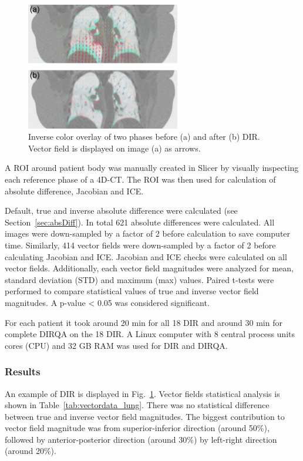 \begin{figure}[H]
	\begin{center}		
		\includegraphics[width=0.6\textwidth]{./VisualMotionManagment/Images/exampleReg.png}
		\caption{Inverse color overlay of two phases before (a) and after (b) DIR. Vector field is displayed on image (a) as arrows.}
		\label{exampleReg_lung}
	\end{center}
\end{figure}

A ROI around patient body was manually created in Slicer by visually inspecting each reference phase of a 4D-CT. The ROI was then used for calculation of absolute difference, Jacobian and ICE.

Default, true and inverse absolute difference were calculated (see Section~\ref{sec:absDiff}). In total 621 absolute differences were calculated. All images were down-sampled by a factor of 2
before calculation to save computer time. Similarly, 414 vector fields were down-sampled by a factor of 2 before calculating Jacobian and ICE. Jacobian and ICE checks were calculated on all vector fields.
Additionally, each vector field magnitudes were analyzed for mean, standard deviation (STD) and maximum (max) values. Paired t-tests were performed to compare statistical values of true and inverse vector field magnitudes.
A p-value < 0.05 was considered significant. 


For each patient it took around 20 min for all 18 DIR and around 30 min for complete DIRQA on the 18 DIR. A Linux computer with 8 central process units cores (CPU) and 32 GB RAM was used for DIR and DIRQA.


\subsubsection{Results}

An example of DIR is displayed in Fig.~\ref{exampleReg_lung}. Vector fields statistical analysis is shown in Table~\ref{tab:vectordata_lung}. There was no statistical
difference between true and inverse vector field magnitudes. The biggest contribution to vector field magnitude was from superior-inferior direction (around 50\%), followed by anterior-posterior direction (around 30\%)
by left-right direction (around 20\%).


